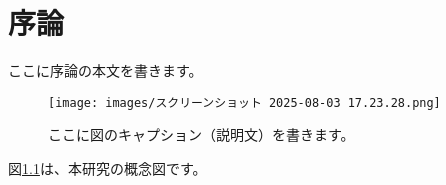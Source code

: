 \chapter{序論}
ここに序論の本文を書きます。

\begin{figure}[htbp]
  \centering
  \texttt{[image: images/スクリーンショット 2025-08-03 17.23.28.png]}
  \caption{ここに図のキャプション（説明文）を書きます。}
  \label{fig:myfigure}
\end{figure}

図\ref{fig:myfigure}は、本研究の概念図です。
